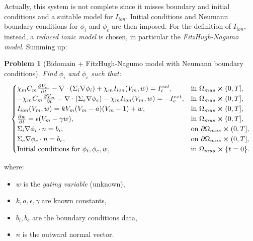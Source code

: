 \documentclass[a4paper,11pt]{article}
\newtheorem{problem}{Problem}
\begin{document}
    \vspace{4mm}
    \noindent Actually, this system is not complete since it misses boundary and initial conditions and a suitable model for $I_{ion}$. Initial conditions and Neumann boundary conditions for $\phi_i$ and $\phi_e$ are then imposed. For the definition of $I_{ion}$, instead, a \emph{reduced ionic model} is chosen, in particular the \emph{FitzHugh-Nagumo model}. Summing up:\newpage
        \begin{problem}[Bidomain + FitzHugh-Nagumo model with Neumann boundary conditions]\label{def1}
      	Find $\phi_i$ and $\phi_e$ such that:
    	\begin{equation*}
    	\begin{cases}
    	\chi_m C_m\pdv{V_m}{t} - \nabla \cdot (\Sigma_i \nabla \phi_i) + \chi_m I_{ion}(V_m,w) = I_i^{ext},    & \text{in } \Omega_{mus} \cross (0,T],
    	\\
    	-\chi_m C_m\pdv{V_m}{t} - \nabla \cdot (\Sigma_e \nabla \phi_e) - \chi_m I_{ion}(V_m,w) = -I_e^{ext},    & \text{in } \Omega_{mus} \cross (0,T],
    	\\
    	I_{ion}(V_m,w)=kV_m(V_m-a)(V_m-1)+w, & \text{in } \Omega_{mus} \cross (0,T],
    	\\
    	\pdv{w}{t} = \epsilon(V_m-\gamma w),  & \text{in } \Omega_{mus} \cross (0,T],
    	\\
    	\Sigma_i\nabla \phi_i \cdot n = b_i,   & \text{on } \partial \Omega_{mus} \cross (0,T],
    	\\
    	\Sigma_e\nabla \phi_e \cdot n = b_e,   & \text{on } \partial \Omega_{mus} \cross (0,T],
    	\\
    	\text{Initial conditions for } \phi_i,\phi_e, w, & \text{in } \Omega_{mus}\cross\{t=0\}.
    	\end{cases}
    	\end{equation*}
    	\end{problem}
    \vspace{3mm}
    where:
    \begin{itemize}[label=\textendash]
    	\item $w$ is the \emph{gating variable} (unknown),
    	\item $k,a,\epsilon,\gamma$ are known constants,
    	\item $b_i,b_e$ are the boundary conditions data,
    	\item $n$ is the outward normal vector.
    \end{itemize}
    
\end{document}
